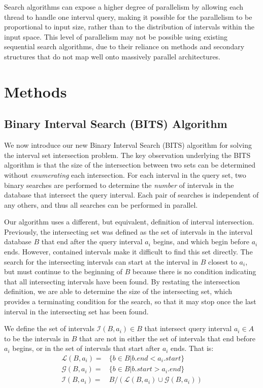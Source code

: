 \documentclass{bioinfo}
\begin{document}
	Search algorithms can expose a higher degree of parallelism by
	allowing each thread to handle one interval query, making it possible
	for the parallelism to be proportional to input size, rather than to
	the distribution of intervals within the input space.  This level of
	parallelism may not be possible using existing sequential search
	algorithms, due to their reliance on methods and secondary structures
	that do not map well onto massively parallel architectures.


	\section{Methods}
	\subsection{Binary Interval Search (BITS) Algorithm}
	We now introduce our new Binary Interval Search (BITS) algorithm for solving
	the interval set intersection problem.  The key observation underlying the BITS 
	algorithm is that the size of the intersection between two sets can be 
	determined without \emph{enumerating} each intersection.  For each interval 
	in the query set, two binary searches are performed to determine the \emph{number} 
	of intervals in the database that intersect the query interval.  Each pair of
	searches is independent of any others, and thus all searches can be
	performed in parallel.  

	Our algorithm uses a different, but equivalent, definition of interval
	intersection.  Previously, the intersecting set was defined as the set
	of intervals in the interval database $B$ that end after the query
	interval $a_i$ begins, and which begin before $a_i$ ends.  However,
	contained intervals make it difficult to find this set directly.  The
	search for the intersecting intervals can start at the interval in $B$
	closest to $a_i$, but must continue to the beginning of $B$ because
	there is no condition indicating that all intersecting intervals have
	been found.  By restating the intersection definition, we are able to
	determine the size of the intersecting set, which provides a
	terminating condition for the search, so that it may stop once the
	last interval in the intersecting set has been found.

	We define the set of intervals $\mathcal{I}(B,a_i) \in B$ that
	intersect query interval $a_i\in A$ to be the intervals in $B$ that
	are not in either the set of intervals that end before $a_i$ begins,
	or in the set of intervals that start after $a_i$ ends.  That is:
	\begin{equation*}
		\begin{split}
			\mathcal{L}(B,a_i) = &\{b\in B| b.end < a_i.start\} \\
			\mathcal{G}(B,a_i) = &\{b\in B| b.start > a_i.end\} \\
			\mathcal{I}(B,a_i) = &B / (\mathcal{L}(B,a_i) \cup \mathcal{G}(B,a_i))
		\end{split}
	\end{equation*}
\end{document}
